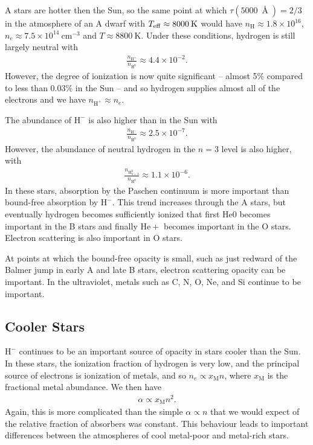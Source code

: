 A stars are hotter then the Sun, so the same point at which
$\tau(5000\:{\Angstrom}) = 2/3$ in the atmosphere of an A
dwarf with $T_\mathrm{eff} \approx 8000\:\mathrm{K}$ would have
$n_\mathrm{H} \approx 1.8
\times 10^{16}$, $n_e \approx 7.5 \times
10^{14}\:\mathrm{cm^{-3}}$ and $T \approx 8800\:\mathrm{K}$.
Under these conditions, hydrogen is still largely neutral
with
\begin{align}
\frac{n_\mathrm{H^+}}{n_\mathrm{H^0}}
\approx
4.4 \times 10^{-2}.
\end{align}
However, the degree of ionization is now quite significant
-- almost 5\% compared to less than 0.03\% in the Sun -- and
so hydrogen supplies almost all of the electrons and we have
$n_\mathrm{H^+} \approx n_e$.

The abundance of $\mathrm{H^-}$ is also higher than in the
Sun with
\begin{align}
\frac{n_\mathrm{H^-}}{n_\mathrm{H^0}} \approx 2.5 \times 10^{-7}.
\end{align}
However, the abundance of neutral hydrogen in the $n=3$
level is also higher, with
\begin{align}
\frac{n_{\mathrm{H}^0_{n=3}}}{n_\mathrm{H^0}} \approx 1.1 \times 10^{-6}.
\end{align}
In these stars, absorption by the Paschen continuum is more
important than bound-free absorption by $\mathrm{H^-}$. This
trend increases through the A stars, but eventually hydrogen
becomes sufficiently ionized that first $\mathrm{He}{0}$
becomes important in the B stars and finally
$\mathrm{He}{+}$ becomes important in the O
stars. Electron scattering is also
important in O stars.


At points at which the bound-free opacity is small, such as
just redward of the Balmer jump in early A and late B stars,
electron scattering opacity can be important. In the
ultraviolet, metals such as C, N, O, Ne, and Si continue to
be important.


\newslide

\subsection{Cooler Stars}

$\mathrm{H^-}$ continues to be an important source of
opacity in stars cooler than the Sun. In these stars, the
ionization fraction of hydrogen is very low, and the
principal source of electrons is ionization of metals, and
so $n_e \propto x_\mathrm{M} n$, where $x_\mathrm{M}$ is the
fractional metal abundance. We then have
\begin{align}
\alpha \propto x_\mathrm{M} n^2.
\end{align}
Again, this is more complicated than the simple $\alpha
\propto n$ that we would expect of the relative fraction of
absorbers was constant. This behaviour leads to important
differences between the atmospheres of cool metal-poor and
metal-rich stars.

